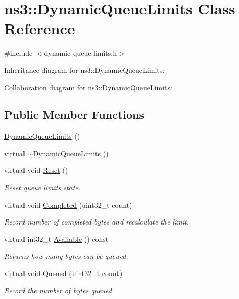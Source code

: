 \hypertarget{classns3_1_1DynamicQueueLimits}{}\section{ns3\+:\+:Dynamic\+Queue\+Limits Class Reference}
\label{classns3_1_1DynamicQueueLimits}


{\ttfamily \#include $<$dynamic-\/queue-\/limits.\+h$>$}



Inheritance diagram for ns3\+:\+:Dynamic\+Queue\+Limits\+:


Collaboration diagram for ns3\+:\+:Dynamic\+Queue\+Limits\+:
\subsection*{Public Member Functions}
\begin{DoxyCompactItemize}
\item 
\hyperlink{classns3_1_1DynamicQueueLimits_a07592bd67de5bfd780e968f6b346ac61}{Dynamic\+Queue\+Limits} ()
\item 
virtual \hyperlink{classns3_1_1DynamicQueueLimits_a3ea3ee0a3994027e47d23db503caf886}{$\sim$\+Dynamic\+Queue\+Limits} ()
\item 
virtual void \hyperlink{classns3_1_1DynamicQueueLimits_a94a1daf2abc0544908d21200aa7b4dbb}{Reset} ()
\begin{DoxyCompactList}\small\item\em Reset queue limits state. \end{DoxyCompactList}\item 
virtual void \hyperlink{classns3_1_1DynamicQueueLimits_afb93b0f1b631e8336de22fe0239d7f0a}{Completed} (uint32\+\_\+t count)
\begin{DoxyCompactList}\small\item\em Record number of completed bytes and recalculate the limit. \end{DoxyCompactList}\item 
virtual int32\+\_\+t \hyperlink{classns3_1_1DynamicQueueLimits_a8e340e0743a4c40c38a97b0994f3d52a}{Available} () const 
\begin{DoxyCompactList}\small\item\em Returns how many bytes can be queued. \end{DoxyCompactList}\item 
virtual void \hyperlink{classns3_1_1DynamicQueueLimits_a89b242e59d1c0765d49633afd4ae7e09}{Queued} (uint32\+\_\+t count)
\begin{DoxyCompactList}\small\item\em Record the number of bytes queued. \end{DoxyCompactList}\end{DoxyCompactItemize}
